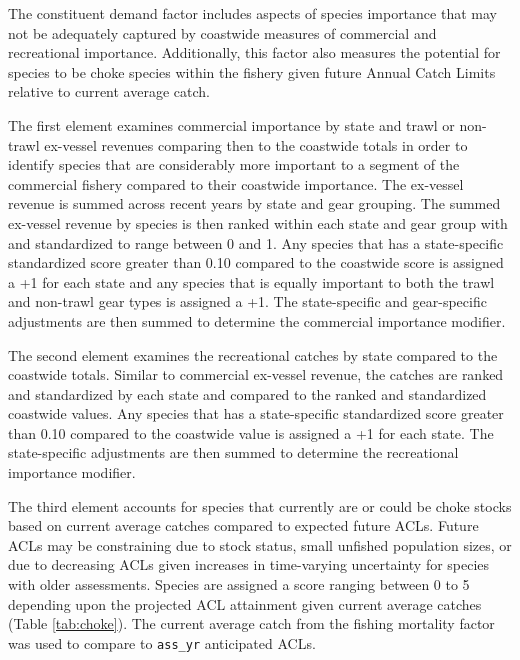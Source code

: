 \documentclass[11pt,
  english,
  a4paper,
]{article}
\begin{document}
The constituent demand factor includes aspects of species importance that may not be adequately captured by coastwide measures of commercial and recreational importance. Additionally, this factor also measures the potential for species to be choke species within the fishery given future Annual Catch Limits relative to current average catch.

The first element examines commercial importance by state and trawl or non-trawl ex-vessel revenues comparing then to the coastwide totals in order to identify species that are considerably more important to a segment of the commercial fishery compared to their coastwide importance. The ex-vessel revenue is summed across recent years by state and gear grouping. The summed ex-vessel revenue by species is then ranked within each state and gear group with and standardized to range between 0 and 1. Any species that has a state-specific standardized score greater than 0.10 compared to the coastwide score is assigned a +1 for each state and any species that is equally important to both the trawl and non-trawl gear types is assigned a +1. The state-specific and gear-specific adjustments are then summed to determine the commercial importance modifier.

The second element examines the recreational catches by state compared to the coastwide totals. Similar to commercial ex-vessel revenue, the catches are ranked and standardized by each state and compared to the ranked and standardized coastwide values. Any species that has a state-specific standardized score greater than 0.10 compared to the coastwide value is assigned a +1 for each state. The state-specific adjustments are then summed to determine the recreational importance modifier.

The third element accounts for species that currently are or could be choke stocks based on current average catches compared to expected future ACLs. Future ACLs may be constraining due to stock status, small unfished population sizes, or due to decreasing ACLs given increases in time-varying uncertainty for species with older assessments. Species are assigned a score ranging between 0 to 5 depending upon the projected ACL attainment given current average catches (Table \ref{tab:choke}). The current average catch from the fishing mortality factor was used to compare to \texttt{ass\_yr} anticipated ACLs.

\begingroup\fontsize{10}{12}\selectfont
\begingroup\fontsize{10}{12}\selectfont
\end{document}
